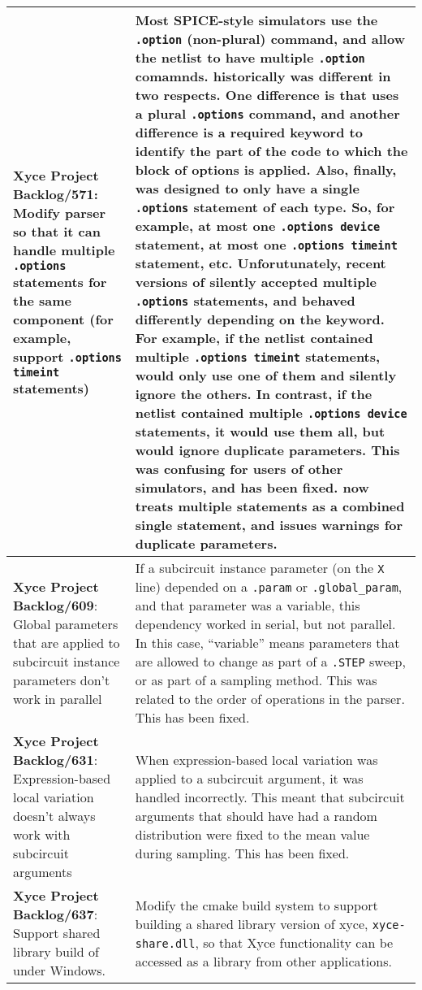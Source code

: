 {\begin{longtable}[h] {>{\raggedright\small}m{2in}|>{\raggedright\let\\\tabularnewline\small}m{3.5in}}
  \textbf{Xyce Project Backlog/571}: Modify \Xyce{} parser so that it can
  handle multiple \texttt{.options} statements for the same component (for
  example, support \texttt{.options timeint} statements) &
  Most SPICE-style simulators use the \texttt{.option} (non-plural) command,
  and allow the netlist to have multiple \texttt{.option} comamnds.   \Xyce{}
  historically was different in two respects.  One difference is that \Xyce{}
  uses a plural \texttt{.options} command, and another difference is a required
  keyword to identify the part of the code to which the block of options is
  applied.  Also, finally, \Xyce{} was designed to only have a single
  \texttt{.options} statement of each type.  So, for example, at most one
  \texttt{.options device} statement, at most one \texttt{.options timeint}
  statement, etc.  Unforutunately, recent versions of \Xyce{} silently accepted
  multiple \texttt{.options} statements, and behaved differently depending on
  the keyword.  For example, if the netlist contained multiple \texttt{.options
  timeint} statements, \Xyce{} would only use one of them and silently ignore
  the others.  In contrast, if the netlist contained multiple \texttt{.options
  device} statements, it would use them all, but would ignore duplicate
  parameters.  This was confusing for users of other simulators, and has been
  fixed.  \Xyce{} now treats multiple statements as a combined single
  statement, and issues warnings for duplicate parameters.
  \\\hline
 
 \textbf{Xyce Project Backlog/609}: 
  Global parameters that are applied to subcircuit instance parameters don't work in parallel & 
  If a subcircuit instance parameter (on the \texttt{X} line) depended on a
  \texttt{.param} or \texttt{.global\_param}, and that parameter was a
  variable, this dependency worked in serial, but not parallel.  In this case,
  ``variable'' means parameters that are allowed to change as part of a
  \texttt{.STEP} sweep, or as part of a sampling method.  This was related to
  the order of operations in the parser.  This has been fixed.  \\ \hline

 \textbf{Xyce Project Backlog/631}: 
  Expression-based local variation doesn't always work with subcircuit arguments & 
  When expression-based local variation was applied to a subcircuit argument, it 
  was handled incorrectly.  This meant that subcircuit arguments that should have 
  had a random distribution were fixed to the mean value during sampling.  
  This has been fixed.  \\ \hline

  \textbf{Xyce Project Backlog/637}: Support shared library build of \Xyce{} under Windows.
  &  Modify the cmake build system to support building a shared library version
  of xyce, \texttt{xyce-share.dll}, so that Xyce functionality can be accessed
  as a library from other applications.  \\\hline


\end{longtable}
}
